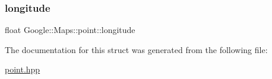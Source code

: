 \mbox{\label{a00052_a488d9eb28fe2486d91173646ab620202}} 
\subsubsection{\texorpdfstring{longitude}{longitude}}
{\footnotesize\ttfamily float Google\+::\+Maps\+::point\+::longitude\hspace{0.3cm}{\ttfamily [private]}}



The documentation for this struct was generated from the following file\+:\begin{DoxyCompactItemize}
\item 
\hyperlink{a00026}{point.\+hpp}\end{DoxyCompactItemize}
